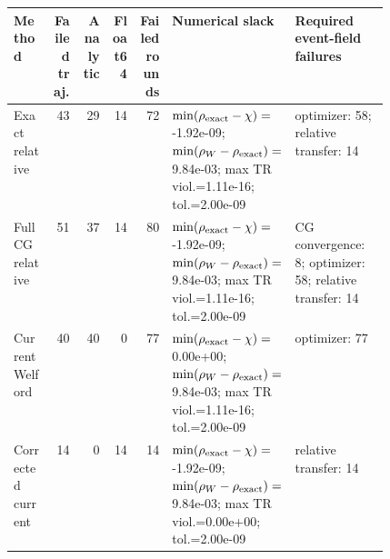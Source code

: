 \par\smallskip
\begin{tabular}{lrrrrp{0.23\linewidth}p{0.25\linewidth}}
\toprule
Method & Failed traj. & Analytic & Float64 & Failed rounds & Numerical slack & Required event-field failures \\
\midrule
Exact relative & 43 & 29 & 14 & 72 & $\min(\rho_{\rm exact}-\chi)=$-1.92e-09; $\min(\rho_W-\rho_{\rm exact})=$9.84e-03; max TR viol.=1.11e-16; tol.=2.00e-09 & optimizer: 58; relative transfer: 14 \\
Full CG relative & 51 & 37 & 14 & 80 & $\min(\rho_{\rm exact}-\chi)=$-1.92e-09; $\min(\rho_W-\rho_{\rm exact})=$9.84e-03; max TR viol.=1.11e-16; tol.=2.00e-09 & CG convergence: 8; optimizer: 58; relative transfer: 14 \\
Current Welford & 40 & 40 & 0 & 77 & $\min(\rho_{\rm exact}-\chi)=$0.00e+00; $\min(\rho_W-\rho_{\rm exact})=$9.84e-03; max TR viol.=1.11e-16; tol.=2.00e-09 & optimizer: 77 \\
Corrected current & 14 & 0 & 14 & 14 & $\min(\rho_{\rm exact}-\chi)=$-1.92e-09; $\min(\rho_W-\rho_{\rm exact})=$9.84e-03; max TR viol.=0.00e+00; tol.=2.00e-09 & relative transfer: 14 \\
\bottomrule
\end{tabular}
